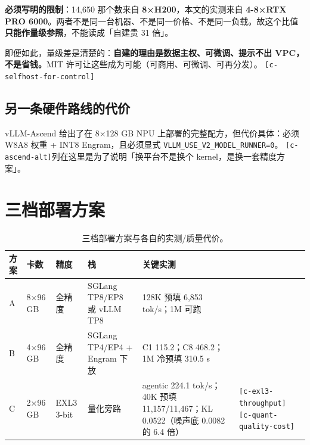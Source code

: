 \textbf{必须写明的限制}：14,650 那个数来自 \textbf{8×H200}，本文的实测来自 \textbf{4-\hspace{0pt}8×RTX PRO 6000}。两者不是同一台机器、不是同一价格、不是同一负载。故这个比值\textbf{只能作量级参照}，不能读成「自建贵 31 倍」。


即便如此，量级差是清楚的：\textbf{自建的理由是数据主权、可微调、提示不出 VPC，不是省钱。}MIT 许可让这些成为可能（可商用、可微调、可再分发）。 {\scriptsize\texttt{[c-\hspace{0pt}selfhost-\hspace{0pt}for-\hspace{0pt}control]}}


\subsection{另一条硬件路线的代价}

vLLM-Ascend 给出了在 8×128 GB NPU 上部署的完整配方，但代价具体：必须 W8A8 权重 + INT8 Engram，且必须显式 \texttt{VLLM\_USE\_V2\_MODEL\_RUNNER=0}。 {\scriptsize\texttt{[c-\hspace{0pt}ascend-\hspace{0pt}alt]}}列在这里是为了说明「换平台不是换个 kernel，是换一套精度方案」。



\section{三档部署方案}

\begin{table}[t]
\centering
\footnotesize
\setlength{\tabcolsep}{4pt}
\caption{三档部署方案与各自的实测/质量代价。}
\label{tab:17}
\begin{tabularx}{\textwidth}{lllXXX}
\toprule
方案 & 卡数 & 精度 & 栈 & 关键实测 &  \\
\midrule
A & 8×96 GB & 全精度 & SGLang TP8/EP8 或 vLLM TP8 & 128K 预填 6,853 tok/s；1M 可跑 &  \\
B & 4×96 GB & 全精度 & SGLang TP4/EP4 + Engram 下放 & C1 115.2；C8 468.2；1M 冷预填 310.5 s &  \\
C & 2×96 GB & EXL3 3-bit & 量化旁路 & agentic 224.1 tok/s；40K 预填 11,157/11,467；KL 0.0522（噪声底 0.0082 的 6.4 倍） & {\scriptsize\texttt{[c-\hspace{0pt}exl3-\hspace{0pt}throughput]}} {\scriptsize\texttt{[c-\hspace{0pt}quant-\hspace{0pt}quality-\hspace{0pt}cost]}} \\
\bottomrule
\end{tabularx}
\end{table}

